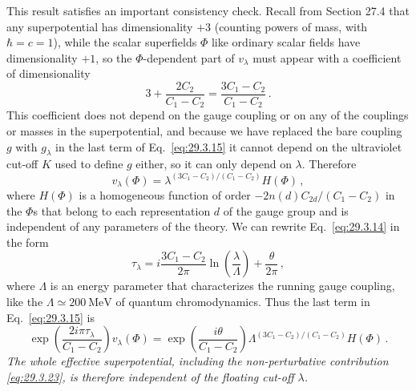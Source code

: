 This result satisfies an important consistency check. Recall from
Section 27.4 that any superpotential has dimensionality \(+3\) (counting
powers of mass, with \(\hbar=c=1\)), while the scalar superfields \(\Phi\)
like ordinary scalar fields have dimensionality \(+1\), so the
\(\Phi\)-dependent part of \(v_\lambda\) must appear with a coefficient of
dimensionality
\[
  3+\frac{2C_2}{C_1-C_2}
  =
  \frac{3C_1-C_2}{C_1-C_2}\,.
\]
This coefficient does not depend on the gauge coupling or on any of the
couplings or masses in the superpotential, and because we have replaced
the bare coupling \(g\) with \(g_\lambda\) in the last term of
Eq.~\eqref{eq:29.3.15} it cannot depend on the ultraviolet cut-off \(K\)
used to define \(g\) either, so it can only depend on \(\lambda\).
Therefore
\begin{equation}
  v_\lambda(\Phi)
  =
  \lambda^{(3C_1-C_2)/(C_1-C_2)}H(\Phi)\,,
  \tag{29.3.21}\label{eq:29.3.21}
\end{equation}
where \(H(\Phi)\) is a homogeneous function of order
\(-2n(d)C_{2d}/(C_1-C_2)\) in the \(\Phi\)s that belong to each
representation \(d\) of the gauge group and is independent of any
parameters of the theory. We can rewrite Eq.~\eqref{eq:29.3.14} in the
form
\begin{equation}
  \tau_\lambda
  =
  i\frac{3C_1-C_2}{2\pi}
  \ln\left(\frac{\lambda}{\Lambda}\right)
  +\frac{\theta}{2\pi}\,,
  \tag{29.3.22}\label{eq:29.3.22}
\end{equation}
where \(\Lambda\) is an energy parameter that characterizes the running
gauge coupling, like the \(\Lambda\simeq200\ \mathrm{MeV}\) of quantum
chromodynamics. Thus the last term in Eq.~\eqref{eq:29.3.15} is
\begin{equation}
  \exp\left(\frac{2i\pi\tau_\lambda}{C_1-C_2}\right)
  v_\lambda(\Phi)
  =
  \exp\left(\frac{i\theta}{C_1-C_2}\right)
  \Lambda^{(3C_1-C_2)/(C_1-C_2)}H(\Phi)\,.
  \tag{29.3.23}\label{eq:29.3.23}
\end{equation}
\emph{The whole effective superpotential, including the non-perturbative
contribution \eqref{eq:29.3.23}, is therefore independent of the floating
cut-off \(\lambda\).}

